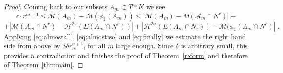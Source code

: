 \documentclass[12pt,leqno]{amsart}
\numberwithin{equation}{section}
\newtheorem{lem}[thm]{Lemma}
\theoremstyle{definition}
\theoremstyle{remark}
\newcommand{\tref}[1]{Theorem~\ref{#1}}
\newcommand{\vol}{\mathrm{vol}}
\begin{document}
\begin{proof}
Coming back to our subsets $A_m\subset T^{r_m} K$ we see 
$$\epsilon \cdot r^{m+1} \leq \mathcal M ( A_m) - \mathcal M( \phi _1 (A_m)) \leq |\mathcal M (A_m) -  M(\mathcal A_m \cap N^r )| +$$ 
$$+|\mathcal M (A_m \cap N^r )  - \mathcal H^{2n} (E(A_m \cap N^r) )| + | \mathcal H ^{2n} (E(A_m \cap N_r)) - \mathcal M (\phi _1(A_m \cap N^r)|  \;.$$  
Applying  \eqref{eq:almostall}, \eqref{eq:almostiso} and \eqref{eq:finally}  we estimate the right hand side from above by $3 \delta r _m^{n+1}$, for all $m$ large enough.
Since $\delta$ is arbitrary small, this provides a  contradiction  and  finishes the proof of \tref{reform} and therefore of \tref{thmmain}.
\end{proof}
















\end{document}
